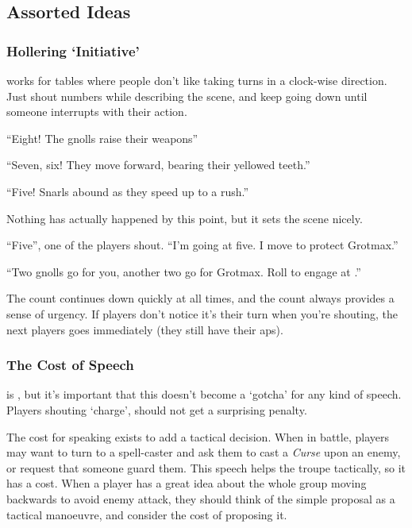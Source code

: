 \begin{multicols}{2}

\subsection{Assorted Ideas}

\subsubsection{Hollering `Initiative'}
works for tables where people don't like taking turns in a clock-wise direction.
Just shout numbers while describing the scene, and keep going down until someone interrupts with their action.

\begin{speechtext}

``Eight! The gnolls raise their weapons''

``Seven, six! They move forward, bearing their yellowed teeth.''

``Five! Snarls abound as they speed up to a rush.''

\end{speechtext}

Nothing has actually happened by this point, but it sets the scene nicely.

\begin{speechtext}

  ``Five'', one of the players shout.
  ``I'm going at five.
  I move to protect Grotmax.''

  ``Two gnolls go for you, another two go for Grotmax.
  Roll to engage at \tn[11].''

\end{speechtext}

The count continues down quickly at all times, and the count always provides a sense of urgency.
If players don't notice it's their turn when you're shouting, the next players goes immediately (they still have their \glspl{ap}).

\subsubsection{The Cost of Speech}
is , but it's important that this doesn't become a `gotcha' for any kind of speech.
Players shouting `charge', should not get a surprising penalty.

The cost for speaking exists to add a tactical decision.
When in battle, players may want to turn to a spell-caster and ask them to cast a \textit{Curse} upon an enemy, or request that someone guard them.
This speech helps the troupe tactically, so it has a cost.
When a player has a great idea about the whole group moving backwards to avoid enemy attack, they should think of the simple proposal as a tactical manoeuvre, and consider the cost of proposing it.


\end{multicols}
